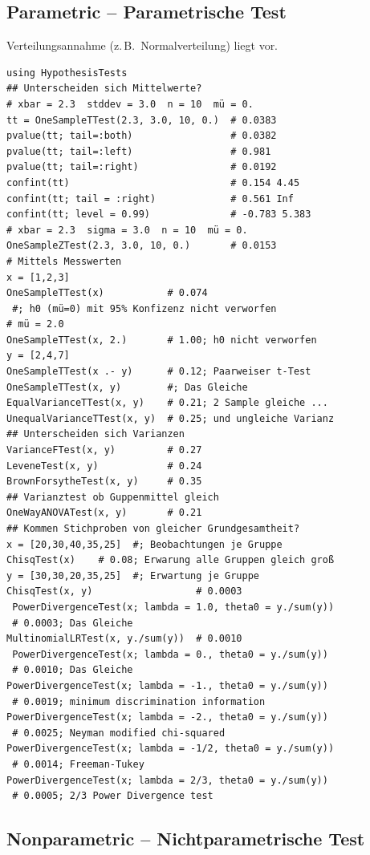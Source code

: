\documentclass[10pt,twocolumn]{scrartcl}
\begin{document}
\subsection{Parametric -- Parametrische Test}

Verteilungsannahme (z.\,B.\ Normalverteilung) liegt vor.

\begin{lstlisting}
using HypothesisTests
## Unterscheiden sich Mittelwerte?
# xbar = 2.3  stddev = 3.0  n = 10  mü = 0.
tt = OneSampleTTest(2.3, 3.0, 10, 0.)  # 0.0383
pvalue(tt; tail=:both)                 # 0.0382
pvalue(tt; tail=:left)                 # 0.981
pvalue(tt; tail=:right)                # 0.0192
confint(tt)                            # 0.154 4.45
confint(tt; tail = :right)             # 0.561 Inf
confint(tt; level = 0.99)              # -0.783 5.383
# xbar = 2.3  sigma = 3.0  n = 10  mü = 0.
OneSampleZTest(2.3, 3.0, 10, 0.)       # 0.0153
# Mittels Messwerten
x = [1,2,3]
OneSampleTTest(x)           # 0.074
 #; h0 (mü=0) mit 95% Konfizenz nicht verworfen
# mü = 2.0
OneSampleTTest(x, 2.)       # 1.00; h0 nicht verworfen
y = [2,4,7]
OneSampleTTest(x .- y)      # 0.12; Paarweiser t-Test
OneSampleTTest(x, y)        #; Das Gleiche
EqualVarianceTTest(x, y)    # 0.21; 2 Sample gleiche ...
UnequalVarianceTTest(x, y)  # 0.25; und ungleiche Varianz
## Unterscheiden sich Varianzen
VarianceFTest(x, y)         # 0.27
LeveneTest(x, y)            # 0.24
BrownForsytheTest(x, y)     # 0.35
## Varianztest ob Guppenmittel gleich
OneWayANOVATest(x, y)       # 0.21
## Kommen Stichproben von gleicher Grundgesamtheit?
x = [20,30,40,35,25]  #; Beobachtungen je Gruppe
ChisqTest(x)    # 0.08; Erwarung alle Gruppen gleich groß
y = [30,30,20,35,25]  #; Erwartung je Gruppe
ChisqTest(x, y)                  # 0.0003
 PowerDivergenceTest(x; lambda = 1.0, theta0 = y./sum(y))
 # 0.0003; Das Gleiche
MultinomialLRTest(x, y./sum(y))  # 0.0010
 PowerDivergenceTest(x; lambda = 0., theta0 = y./sum(y))
 # 0.0010; Das Gleiche
PowerDivergenceTest(x; lambda = -1., theta0 = y./sum(y))
 # 0.0019; minimum discrimination information
PowerDivergenceTest(x; lambda = -2., theta0 = y./sum(y))
 # 0.0025; Neyman modified chi-squared
PowerDivergenceTest(x; lambda = -1/2, theta0 = y./sum(y))
 # 0.0014; Freeman-Tukey
PowerDivergenceTest(x; lambda = 2/3, theta0 = y./sum(y))
 # 0.0005; 2/3 Power Divergence test
\end{lstlisting}

\subsection{Nonparametric -- Nichtparametrische Test}
\end{document}
